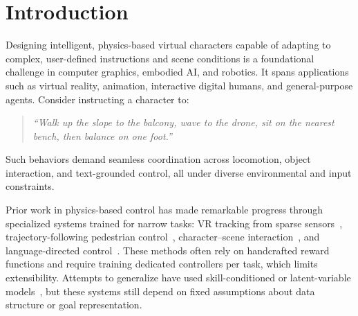 \documentclass[10pt,letterpaper]{article}
\begin{document}
\begin{abstract}
Transformer-based motion inpainting has emerged as a powerful method for recovering missing or corrupted motion sequences in character control tasks. Most current approaches, including MaskedMimic, rely on fixed or randomly sampled masking schedules that are agnostic to training dynamics, which leads to inefficient learning and brittle generalization under sparse or adversarial corruption. We propose a dynamic masking framework in which a meta-reinforcement-learning policy learns to predict the masking ratio $\rho$ at each training step. The policy is trained with Proximal Policy Optimization (PPO) and guided by validation-loss deltas and downstream task metrics such as Fr\'echet Inception Distance (FID) and action accuracy. We integrate this adaptive masking strategy into the MaskedMimic framework and show that it improves convergence speed, reconstruction fidelity, and robustness across input modalities including joint subsets, object interaction, and text cues. On AMASS the learned schedule outperforms cosine and random baselines on every metric we track, and it generalizes to a held-out motion and to unseen HumanML3D text prompts, suggesting that learned corruption is a useful meta-learning tool.
\end{abstract}

\section{Introduction}

Designing intelligent, physics-based virtual characters capable of adapting to complex, user-defined instructions and scene conditions is a foundational challenge in computer graphics, embodied AI, and robotics. It spans applications such as virtual reality, animation, interactive digital humans, and general-purpose agents. Consider instructing a character to:
\begin{quote}
\emph{``Walk up the slope to the balcony, wave to the drone, sit on the nearest bench, then balance on one foot.''}
\end{quote}
Such behaviors demand seamless coordination across locomotion, object interaction, and text-grounded control, all under diverse environmental and input constraints.

Prior work in physics-based control has made remarkable progress through specialized systems trained for narrow tasks: VR tracking from sparse sensors~\cite{winkler2022questsim}, trajectory-following pedestrian control~\cite{rempe2023trace}, character--scene interaction~\cite{hassan2023interphys}, and language-directed control~\cite{juravsky2022padl}. These methods often rely on handcrafted reward functions and require training dedicated controllers per task, which limits extensibility. Attempts to generalize have used skill-conditioned or latent-variable models~\cite{peng2022ase,luo2024pulse}, but these systems still depend on fixed assumptions about data structure or goal representation.
\end{document}
